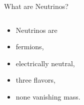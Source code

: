 \documentclass[9pt]{beamer}
\begin{document}
\begin{darkframes}
\begin{frame}{What are Neutrinos?}
\begin{minipage}[\textheight]{\textwidth}
\begin{columns}[T]
      \begin{column}{0.4\textwidth}


          \begin{itemize}
          \item[] Neutrinos are
          \item fermions,
          \item electrically neutral,
          \item three flavors,
          \item none vanishing mass.
          \end{itemize}





\end{column}
\end{columns}
\end{minipage}
\end{frame}
\end{darkframes}
\end{document}
